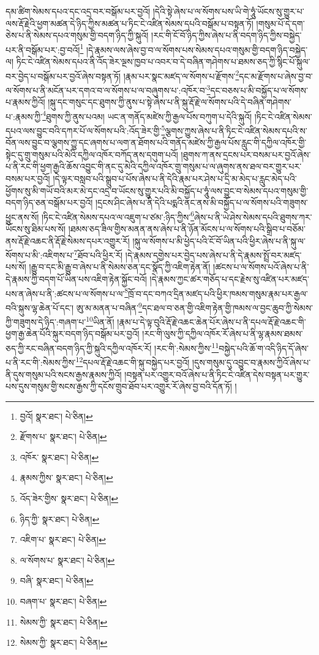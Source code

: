 དམ་ཚིག་སེམས་དཔའ་དང་འདྲ་བར་བསྒོམ་པར་བྱའོ། །དེའི་སྟེ་ཞེས་པ་ལ་སོགས་པས་ཡི་གེ་ཧཱུཾ་ཡོངས་སུ་གྱུར་པ་ལས་རྡོ་རྗེའི་ཕྱག་མཚན་དེ་ཉིད་ཀྱིས་མཚན་པ་ཏིང་ངེ་འཛིན་སེམས་དཔའི་བསྒོམ་པ་བསྟན་ཏོ། །གསུམ་པོ་དེ་དག་ཅེས་པ་ནི་སེམས་དཔའ་གསུམ་གྱི་བདག་ཉིད་ཀྱི་སྐུའོ། །རང་གི་ངོ་བོ་ཉིད་ཀྱིས་ཞེས་པ་ནི་བདག་ཉིད་ཀྱིས་བསྐྱེད་པར་ནི་བསྒོམ་པར་:བྱ་བའོ།\footnote{བྱའོ།  སྣར་ཐང་།  པེ་ཅིན། } །དེ་རྣམས་ལས་ཞེས་བྱ་བ་ལ་སོགས་པས་སེམས་དཔའ་གསུམ་གྱི་བདག་ཉིད་བསྐྱེད་ལ། ཏིང་ངེ་འཛིན་སེམས་དཔའ་ནི་འོད་ཟེར་ལྔས་ཁྱབ་པ་འབར་བ་དེ་བཞིན་གཤེགས་པ་ཐམས་ཅད་ཀྱི་སྙིང་པོ་སྐུལ་བར་བྱེད་པ་བསྒོམ་པར་བྱའོ་ཞེས་བསྟན་ཏོ། །རྣམ་པར་སྣང་མཛད་ལ་སོགས་པ་རྫོགས་\footnote{རྫོགས་པ་  སྣར་ཐང་།  པེ་ཅིན། }དང་མ་རྫོགས་པ་ཞེས་བྱ་བ་ལ་སོགས་པ་ནི་མངོན་པར་དགའ་བ་ལ་སོགས་པ་ལ་བཞུགས་པ་:འཁོར་བ་\footnote{འཁོར་  སྣར་ཐང་།  པེ་ཅིན། }དང་བཅས་པ་མི་བསྐྱོད་པ་ལ་སོགས་པ་རྣམས་ཀྱིའོ། །སྐུ་དང་གསུང་དང་ཐུགས་ཀྱི་ནུས་པ་སྟེ་ཞེས་པ་ནི་སྐུ་རྡོ་རྗེ་ལ་སོགས་པའི་དེ་བཞིན་གཤེགས་པ་:རྣམས་ཀྱི་\footnote{རྣམས་ཀྱིས་  སྣར་ཐང་།  པེ་ཅིན། }ཐུགས་ཀྱི་ནུས་པའམ། ཡང་ན་གནོད་མཛེས་ཀྱི་རྒྱལ་པོས་བཀུག་པ་དེའི་སྐུའོ། །ཏིང་ངེ་འཛིན་སེམས་དཔའ་ལས་བྱུང་བའི་དཀར་པོ་ལ་སོགས་པའི་:འོད་ཟེར་གྱི་\footnote{འོད་ཟེར་གྱིས་  སྣར་ཐང་།  པེ་ཅིན། }ལྕགས་ཀྱུས་ཞེས་པ་ནི་ཏིང་ངེ་འཛིན་སེམས་དཔའི་ས་བོན་ལས་བྱུང་བ་ལྕགས་ཀྱུ་དང་ཞགས་པ་ལག་ན་ཐོགས་པའི་གནོད་མཛེས་ཀྱི་རྒྱལ་པོས་རླུང་གི་དཀྱིལ་འཁོར་གྱི་སྟེང་དུ་གྲུ་གསུམ་པའི་མེའི་དཀྱིལ་འཁོར་བཀོད་ནས་དགུག་པའོ། །ཐུགས་ཀ་ནས་དྲངས་པར་བསམ་པར་བྱའོ་ཞེས་པ་ནི་རང་གི་ཕྱག་རྒྱའི་ཆོས་འབྱུང་གི་ནང་དུ་མེའི་དཀྱིལ་འཁོར་གྲུ་གསུམ་པ་ལ་ཞུགས་ནས་ཐལ་བར་གྱུར་པར་བསམ་པར་བྱའོ། །དེ་ལྟར་བསླབ་པའི་སྒྲུབ་པ་པོས་ཞེས་པ་ནི་དེའི་རྣམ་པར་ཤེས་པ་དྲི་མ་མེད་པ་རླུང་མེད་པའི་ཕྱོགས་སུ་མི་གཡོ་བའི་མར་མེ་དང་འདྲ་བ་ཡོངས་སུ་གྱུར་པའི་མི་བསྐྱོད་པ་ཧཱུཾ་ལས་བྱུང་བ་སེམས་དཔའ་གསུམ་གྱི་བདག་ཉིད་ཅན་བསྒོམ་པར་བྱའོ། །དྲངས་ཤིང་ཞེས་པ་ནི་དེའི་པདྨའི་ནང་ནས་མི་བསྐྱོད་པ་ལ་སོགས་པའི་གཟུགས་ཕྱུང་ནས་སོ། །ཏིང་ངེ་འཛིན་སེམས་དཔའ་ལ་འཇུག་པ་ཙམ་:ཉིད་ཀྱིས་\footnote{ཉིད་ཀྱི་  སྣར་ཐང་།  པེ་ཅིན། }ཞེས་པ་ནི་ཡེ་ཤེས་སེམས་དཔའི་ཐུགས་ཀར་ཡོངས་སུ་ཐིམ་པས་སོ། །ཐམས་ཅད་ཟིལ་གྱིས་མནན་ནས་ཞེས་པ་ནི་ཉོན་མོངས་པ་ལ་སོགས་པའི་སྒྲིབ་པ་བཅོམ་ནས་རྡོ་རྗེ་འཆང་ནི་རྡོ་རྗེ་སེམས་དཔར་འགྱུར་རོ། །སྐུ་ལ་སོགས་པ་མི་ཕྱེད་པའི་ངོ་བོ་ཡིན་པའི་ཕྱིར་ཞེས་པ་ནི་སྐུ་ལ་སོགས་པ་མི་:འཇིགས་པ་\footnote{འཇིག་པ་  སྣར་ཐང་།  པེ་ཅིན། }ཐོབ་པའི་ཕྱིར་རོ། །དེ་རྣམས་དགྱེས་པར་བྱེད་པས་ཞེས་པ་ནི་དེ་རྣམས་སྤྲོ་བར་མཛད་པས་སོ། །རྒྱུ་བ་དང་མི་རྒྱུ་བ་ཞེས་པ་ནི་སེམས་ཅན་དང་སྣོད་ཀྱི་འཇིག་རྟེན་ནོ། །ཚངས་པ་ལ་སོགས་པའོ་ཞེས་པ་ནི་དེ་རྣམས་ཀྱི་བདག་པོ་ཡིན་པས་འཇིག་རྟེན་སྐྱོང་བའོ། །དེ་རྣམས་ཀྱང་ཚར་གཅོད་པ་དང་རྗེས་སུ་འཛིན་པར་མཛད་པས་ན་ཞེས་པ་ནི་:ཚངས་པ་ལ་སོགས་པ་ལ་\footnote{ལ་སོགས་པ་  སྣར་ཐང་།  པེ་ཅིན། }ཁྲོ་བ་དང་བཀའ་དྲིན་མཛད་པའི་ཕྱིར་ཁམས་གསུམ་རྣམ་པར་རྒྱལ་བའི་སྐུས་ལྷ་ཆེན་པོ་དང་། ཨུ་མ་མནན་པ་བཞིན་\footnote{བཞི་  སྣར་ཐང་།  པེ་ཅིན། }དང་ཐལ་བ་ཅན་གྱི་འཇིག་རྟེན་གྱི་ཁམས་ལ་བྱང་ཆུབ་ཀྱི་སེམས་ཀྱི་གཟུགས་དེ་ཉིད་:གཞག་པ་\footnote{བཞག་པ་  སྣར་ཐང་།  པེ་ཅིན། }ཡིན་ནོ། །རྣམ་པ་དེ་ལྟ་བུའི་རྡོ་རྗེ་འཆང་ཆེན་པོར་ཞེས་པ་ནི་དཔལ་རྡོ་རྗེ་འཆང་གི་ཕྱག་རྒྱ་ཆེན་པོའི་སྐུར་བདག་ཉིད་བསྒོམ་པར་བྱའོ། །རང་གི་ལུས་ཀྱི་དཀྱིལ་འཁོར་རོ་ཞེས་པ་ནི་ལྷ་རྣམས་ཐམས་ཅད་ཀྱི་རང་བཞིན་བདག་ཉིད་ཀྱི་སྐུའི་དཀྱིལ་འཁོར་རོ། །རང་གི་:སེམས་ཀྱིས་\footnote{སེམས་ཀྱི་  སྣར་ཐང་།  པེ་ཅིན། }བསྐྱེད་པའི་ཆོ་ག་འདི་ཉིད་དོ་ཞེས་པ་ནི་རང་གི་:སེམས་ཀྱིས་\footnote{སེམས་ཀྱི་  སྣར་ཐང་།  པེ་ཅིན། }དཔལ་རྡོ་རྗེ་འཆང་གི་སྐུ་བསྐྱེད་པར་བྱའོ། །དུས་གསུམ་དུ་འབྱུང་བ་རྣམས་ཀྱིའོ་ཞེས་པ་ནི་དུས་གསུམ་པའི་སངས་རྒྱས་རྣམས་ཀྱིའོ། །བསྟན་པར་འགྱུར་བའོ་ཞེས་པ་ནི་ཏིང་ངེ་འཛིན་དེས་བསྟན་པར་གྱུར་པས་དུས་གསུམ་གྱི་སངས་རྒྱས་ཀྱི་དངོས་གྲུབ་ཐོབ་པར་འགྱུར་རོ་ཞེས་བྱ་བའི་དོན་ཏོ། །
